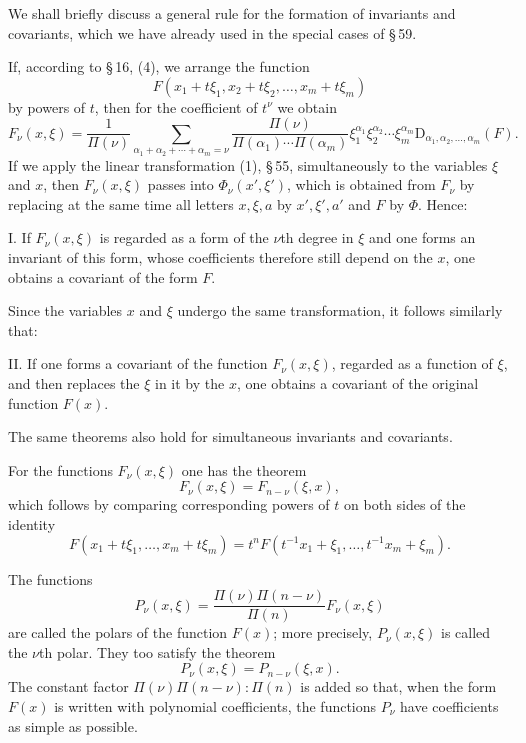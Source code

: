 \documentclass[11pt]{article}
\providecommand{\D}{\mathrm D}
\begin{document}
We shall briefly discuss a general rule for the formation of invariants and covariants, which we have already used in the special cases of \S\,59.

If, according to \S\,16, (4), we arrange the function
\[
 F(x_1+t\xi_1,x_2+t\xi_2,
 \ldots,x_m+t\xi_m)
\]
by powers of $t$, then for the coefficient of $t^\nu$ we obtain
\begin{equation}
 F_\nu(x,\xi)=\frac1{\Pi(\nu)}
 \sum_{\alpha_1+\alpha_2+\cdots+\alpha_m=\nu}
 \frac{\Pi(\nu)}{\Pi(\alpha_1)\cdots\Pi(\alpha_m)}
 \xi_1^{\alpha_1}\xi_2^{\alpha_2}\cdots\xi_m^{\alpha_m}
 \D_{\alpha_1,\alpha_2,\ldots,\alpha_m}(F).
\tag{4}
\end{equation}
If we apply the linear transformation (1), \S\,55, simultaneously to the variables $\xi$ and $x$, then $F_\nu(x,\xi)$ passes into $\Phi_\nu(x',\xi')$, which is obtained from $F_\nu$ by replacing at the same time all letters $x,\xi,a$ by $x',\xi',a'$ and $F$ by $\Phi$. Hence:

I. If $F_\nu(x,\xi)$ is regarded as a form of the $\nu$th degree in $\xi$ and one forms an invariant of this form, whose coefficients therefore still depend on the $x$, one obtains a covariant of the form $F$.

Since the variables $x$ and $\xi$ undergo the same transformation, it follows similarly that:

II. If one forms a covariant of the function $F_\nu(x,\xi)$, regarded as a function of $\xi$, and then replaces the $\xi$ in it by the $x$, one obtains a covariant of the original function $F(x)$.

The same theorems also hold for simultaneous invariants and covariants.

For the functions $F_\nu(x,\xi)$ one has the theorem
\begin{equation}
 F_\nu(x,\xi)=F_{n-\nu}(\xi,x),
\tag{5}
\end{equation}
which follows by comparing corresponding powers of $t$ on both sides of the identity
\[
 F(x_1+t\xi_1,\ldots,x_m+t\xi_m)=t^nF(t^{-1}x_1+\xi_1,\ldots,t^{-1}x_m+\xi_m).
\]

The functions
\[
 P_\nu(x,\xi)=\frac{\Pi(\nu)\Pi(n-\nu)}{\Pi(n)}F_\nu(x,\xi)
\]
are called the polars of the function $F(x)$; more precisely, $P_\nu(x,\xi)$ is called the $\nu$th polar. They too satisfy the theorem
\[
 P_\nu(x,\xi)=P_{n-\nu}(\xi,x).
\]
The constant factor $\Pi(\nu)\Pi(n-\nu):\Pi(n)$ is added so that, when the form $F(x)$ is written with polynomial coefficients, the functions $P_\nu$ have coefficients as simple as possible.
\end{document}
